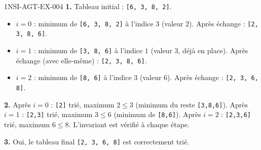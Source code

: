 \begin{corrige}{1NSI-AGT-EX-004}
\textbf{1.} Tableau initial : \lstinline{[6, 3, 8, 2]}.
\begin{itemize}
  \item $i=0$ : minimum de \lstinline{[6, 3, 8, 2]} à l'indice $3$ (valeur $2$). Après échange : \lstinline{[2, 3, 8, 6]}.
  \item $i=1$ : minimum de \lstinline{[3, 8, 6]} à l'indice $1$ (valeur $3$, déjà en place). Après échange (avec elle-même) : \lstinline{[2, 3, 8, 6]}.
  \item $i=2$ : minimum de \lstinline{[8, 6]} à l'indice $3$ (valeur $6$). Après échange : \lstinline{[2, 3, 6, 8]}.
\end{itemize}

\textbf{2.} Après $i=0$ : \lstinline{[2]} trié, maximum $2\leqslant3$ (minimum du reste
\lstinline{[3,8,6]}). Après $i=1$ : \lstinline{[2,3]} trié, maximum $3\leqslant6$ (minimum
de \lstinline{[8,6]}). Après $i=2$ : \lstinline{[2,3,6]} trié, maximum $6\leqslant8$.
L'invariant est vérifié à chaque étape.

\textbf{3.} Oui, le tableau final \lstinline{[2, 3, 6, 8]} est correctement trié.
\end{corrige}
